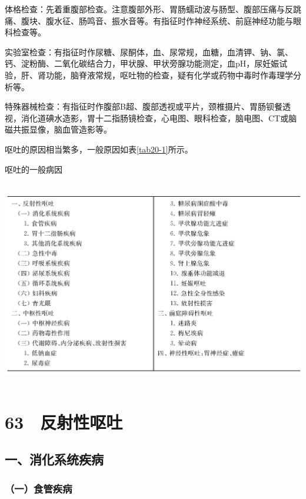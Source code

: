 体格检查：先着重腹部检查。注意腹部外形、胃肠蠕动波与肠型、腹部压痛与反跳痛、腹块、腹水征、肠鸣音、振水音等。有指征时作神经系统、前庭神经功能与眼科检查等。

实验室检查：有指征时作尿糖、尿酮体，血、尿常规，血糖，血清钾、钠、氯、钙、淀粉酶、二氧化碳结合力，甲状腺、甲状旁腺功能测定，血pH，尿妊娠试验，肝、肾功能，脑脊液常规，呕吐物的检查，疑有化学或药物中毒时作毒理学分析等。

特殊器械检查：有指征时作腹部B超、腹部透视或平片，颈椎摄片、胃肠钡餐透视，消化道碘水造影，胃十二指肠镜检查，心电图、眼科检查，脑电图、CT或脑磁共振显像，脑血管造影等。

呕吐的原因相当繁多，一般原因如表\ref{tab20-1}所示。

\begin{table}[htbp]
\centering
\caption{呕吐的一般病因}
\label{tab20-1}
\includegraphics[width=5.89583in,height=3.5625in]{./images/Image00120.jpg}
\end{table}

\protect\hypertarget{text00161.html}{}{}

\section{63　反射性呕吐}

\subsection{一、消化系统疾病}

\subsubsection{（一）食管疾病}

